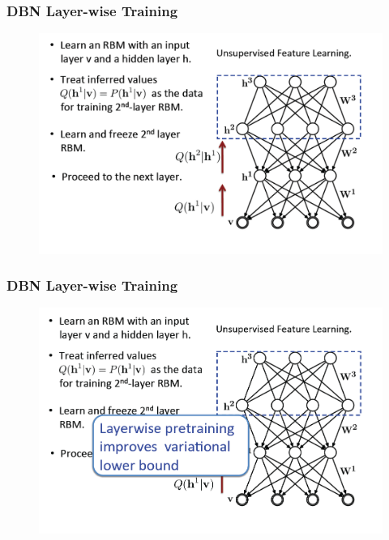 \documentclass{beamer}
\begin{document}
\begin{frame}
\frametitle{DBN Layer-wise Training}
\begin{figure}
      \includegraphics[width=1\textwidth]{figs/rbm32.png}
\end{figure}
\end{frame}

\begin{frame}
\frametitle{DBN Layer-wise Training}
\begin{figure}
      \includegraphics[width=1\textwidth]{figs/rbm33.png}
\end{figure}
\end{frame}
\end{document}
